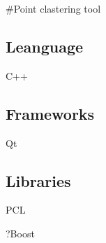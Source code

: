 \#\+Point clastering tool

\subsection*{Leanguage}


\begin{DoxyItemize}
\item C++
\end{DoxyItemize}

\subsection*{Frameworks}


\begin{DoxyItemize}
\item Qt
\end{DoxyItemize}

\subsection*{Libraries}


\begin{DoxyItemize}
\item P\+CL
\item ?Boost 
\end{DoxyItemize}